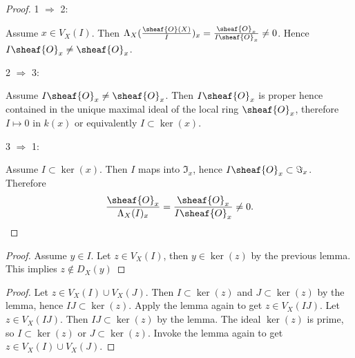 
\begin{proof}
1 $\Rightarrow$ 2:

Assume $x\in V_X(I)$. 
Then $\Lambda_X(\frac{\sheaf{O}(X)}{I})_x = \frac{\sheaf{O}_x}{I\sheaf{O}_x} \neq 0$. 
Hence $I\sheaf{O}_x \neq \sheaf{O}_x$.

2 $\Rightarrow$ 3: 

Assume $I\sheaf{O}_x\neq \sheaf{O}_x$. 
Then $I\sheaf{O}_x$ is proper hence contained in the unique maximal ideal of the local ring $\sheaf{O}_x$, 
therefore $I\mapsto 0$ in $k(x)$ or equivalently $I\subset \ker(x)$.

3 $\Rightarrow$ 1:

Assume $I \subset \ker(x)$. Then $I$ maps into $\Im_x$, hence $I\sheaf{O}_x \subset \Im_x$. Therefore 
\[\frac{\sheaf{O}_x}{\Lambda_X(I)_x} = \frac{\sheaf{O}_x}{I\sheaf{O}_x} \neq 0.\]

\end{proof}
\begin{proof}
Assume $y\in I$.
Let $z\in V_X(I)$, then $y\in \ker(z)$ by the previous lemma.
This implies $z\not\in D_X(y)$
\end{proof}
\begin{proof}
Let $z\in V_X(I)\cup V_X(J)$. Then $I\subset \ker(z)$ and $J\subset \ker(z)$ by the lemma, hence $IJ\subset \ker(z)$.
Apply the lemma again to get $z\in V_X(IJ)$.
Let $z\in V_X(IJ)$. Then $IJ \subset \ker(z)$ by the lemma. The ideal $\ker(z)$ is prime, so $I\subset \ker(z)$ or $J\subset \ker(z)$. Invoke the lemma again to get $z\in V_X(I)\cup V_X(J)$.
\end{proof}
